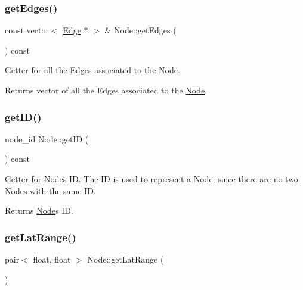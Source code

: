\subsubsection{\texorpdfstring{get\+Edges()}{getEdges()}}
{\footnotesize\ttfamily const vector$<$ \hyperlink{class_edge}{Edge} $\ast$ $>$ \& Node\+::get\+Edges (\begin{DoxyParamCaption}{ }\end{DoxyParamCaption}) const}

Getter for all the Edges associated to the \hyperlink{class_node}{Node}.

\begin{DoxyReturn}{Returns}
vector of all the Edges associated to the \hyperlink{class_node}{Node}. 
\end{DoxyReturn}
\hypertarget{class_node_a5e319f5c050c46590bed81fc4dc54325}{}\label{class_node_a5e319f5c050c46590bed81fc4dc54325} 
\subsubsection{\texorpdfstring{get\+I\+D()}{getID()}}
{\footnotesize\ttfamily node\+\_\+id Node\+::get\+ID (\begin{DoxyParamCaption}{ }\end{DoxyParamCaption}) const}

Getter for \hyperlink{class_node}{Node}\textquotesingle{}s ID. The ID is used to represent a \hyperlink{class_node}{Node}, since there are no two Nodes with the same ID.

\begin{DoxyReturn}{Returns}
\hyperlink{class_node}{Node}\textquotesingle{}s ID. 
\end{DoxyReturn}
\hypertarget{class_node_a258af43995af26e3ce9401bdd4948b30}{}\label{class_node_a258af43995af26e3ce9401bdd4948b30} 
\subsubsection{\texorpdfstring{get\+Lat\+Range()}{getLatRange()}}
{\footnotesize\ttfamily pair$<$ float, float $>$ Node\+::get\+Lat\+Range (\begin{DoxyParamCaption}{ }\end{DoxyParamCaption})\hspace{0.3cm}{\ttfamily [static]}}


